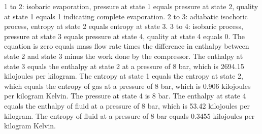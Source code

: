 1 to 2: isobaric evaporation, pressure at state 1 equals pressure at state 2, quality at state 1 equals 1 indicating complete evaporation.
2 to 3: adiabatic isochoric process, entropy at state 2 equals entropy at state 3.
3 to 4: isobaric process, pressure at state 3 equals pressure at state 4, quality at state 4 equals 0.
The equation is zero equals mass flow rate times the difference in enthalpy between state 2 and state 3 minus the work done by the compressor.
The enthalpy at state 3 equals the enthalpy at state 2 at a pressure of 8 bar, which is 2694.15 kilojoules per kilogram.
The entropy at state 1 equals the entropy at state 2, which equals the entropy of gas at a pressure of 8 bar, which is 0.906 kilojoules per kilogram Kelvin.
The pressure at state 4 is 8 bar.
The enthalpy at state 4 equals the enthalpy of fluid at a pressure of 8 bar, which is 53.42 kilojoules per kilogram.
The entropy of fluid at a pressure of 8 bar equals 0.3455 kilojoules per kilogram Kelvin.